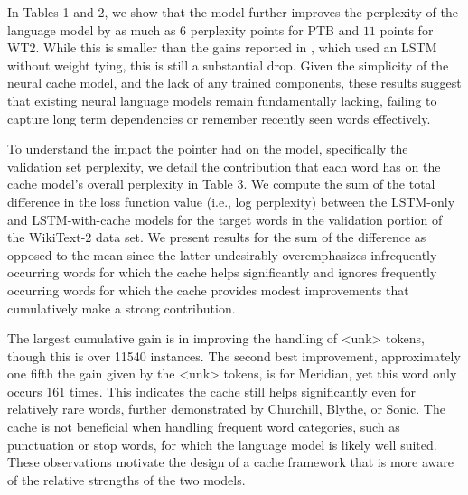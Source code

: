 \documentclass{article}
\begin{document}
In Tables 1 and 2, we show that the model further improves the perplexity of the language model by as much as $6$ perplexity points for PTB and $11$ points for WT2.
While this is smaller than the gains reported in \citet{Grave2016}, which used an LSTM without weight tying, this is still a substantial drop.
Given the simplicity of the neural cache model, and the lack of any trained components, these results suggest that existing neural language models remain fundamentally lacking, failing to capture long term dependencies or remember recently seen words effectively.

To understand the impact the pointer had on the model, specifically the validation set perplexity, we detail the contribution that each word has on the cache model's overall perplexity in Table 3.
We compute the sum of the total difference in the loss function value (i.e., log perplexity) between the LSTM-only and LSTM-with-cache models for the target words in the validation portion of the WikiText-2 data set.
We present results for the sum of the difference as opposed to the mean since the latter undesirably overemphasizes infrequently occurring words for which the cache helps significantly and ignores frequently occurring words for which the cache provides modest improvements that cumulatively make a strong contribution.

The largest cumulative gain is in improving the handling of <unk> tokens, though this is over 11540 instances.
The second best improvement, approximately one fifth the gain given by the <unk> tokens, is for Meridian, yet this word only occurs 161 times.
This indicates the cache still helps significantly even for relatively rare words, further demonstrated by Churchill, Blythe, or Sonic.
The cache is not beneficial when handling frequent word categories, such as punctuation or stop words, for which the language model is likely well suited.
These observations motivate the design of a cache framework that is more aware of the relative strengths of the two models.
\end{document}
